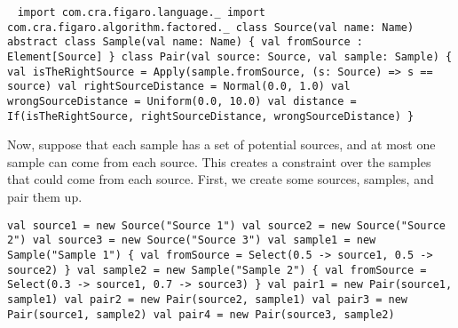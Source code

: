 \begin{flushleft}\
\texttt{import com.cra.figaro.language.\_
\newline import com.cra.figaro.algorithm.factored.\_
\newline 
\newline class Source(val name: Name)
\newline 
\newline abstract class Sample(val name: Name) \{
\newline \tab val fromSource : Element[Source]
\newline \}
\newline 
\newline class Pair(val source: Source, val sample: Sample) \{
\newline \tab val isTheRightSource =
\newline \tab Apply(sample.fromSource, (s: Source) => s == source)
\newline \tab val rightSourceDistance = Normal(0.0, 1.0) 
\newline \tab val wrongSourceDistance = Uniform(0.0, 10.0) 
\newline \tab val distance =
\newline \tab If(isTheRightSource, rightSourceDistance, wrongSourceDistance)
\newline \}
}
\end{flushleft}

Now, suppose that each sample has a set of potential sources, and at most one sample can come from each source. This creates a constraint over the samples that could come from each source.  First, we create some sources, samples, and pair them up.

\begin{flushleft}
\texttt{val source1 = new Source("Source 1") 
\newline val source2 = new Source("Source 2") 
\newline val source3 = new Source("Source 3") 
\newline val sample1 = new Sample("Sample 1") \{
\newline \tab val fromSource = Select(0.5 -> source1, 0.5 -> source2)
\newline \}
\newline 
\newline val sample2 = new Sample("Sample 2") \{
\newline \tab val fromSource = Select(0.3 -> source1, 0.7 -> source3)
\newline \}
\newline 
\newline val pair1 = new Pair(source1, sample1) 
\newline val pair2 = new Pair(source2, sample1) 
\newline val pair3 = new Pair(source1, sample2) 
\newline val pair4 = new Pair(source3, sample2)}
\end{flushleft}

